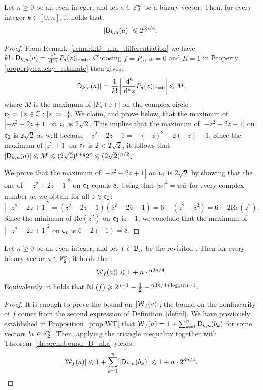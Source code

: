 \documentclass[11pt]{llncs}
\begin{document}
\begin{theorem}\label{theorem:bound_D_nka}
    Let $n\geq 0$ be an even integer, and let $a\in\F_2^n$ be a binary vector. Then, for every integer $k\in[0,n]$, it holds that:
    \[
        |\Dnka nka|\leq 2^{3n/4}.
    \]
\end{theorem}

\begin{proof}
    From Remark~\ref{remark:D_nka_differentiation} we have $k!\cdot\Dnka nka=\frac{\dd^k}{\dd^k z}P_a(z)\vert_{z=0}$. Choosing $f=P_a$, $w=0$ and $R=1$ in Property \ref{property:cauchy_estimate} then gives:
    \[
        |\Dnka nka|=\frac{1}{k!}\left|\frac{\dd^k}{\dd^k z}P_a(z)\vert_{z=0}\right|\leq M,
    \]
    where $M$ is the maximum of $|P_a(z)|$ on the complex circle $\dis=\{ z \in \C: |z|=1  \}$.
    We claim, and prove below, that the maximum of $\left|-z^2+2z+1\right|$ on $\dis$ is $2\sqrt 2$. 
    This implies that the maximum of $\left|-z^2-2z+1\right|$ on $\dis$ is $2\sqrt 2$ as well because $-z^2-2z+1=-(-z)^2+2(-z)+1$. 
    Since the maximum of $\left|z^2+1\right|$ on $\dis$ is $2<2\sqrt 2$, it follows that $|\Dnka nka|\leq M\leq (2\sqrt 2)^{p+q}2^r\leq (2\sqrt 2)^{n/2}$.

	We prove that the maximum of $|-z^2+2z+1|$ on $\dis$ is $2\sqrt 2$ by showing that the one of $|-z^2+2z+1|^2$ on $\dis$ equals $8$.
    Using that $|w|^2=w\overline w$ for every complex number $w$, we obtain for all $z\in \dis$:
    \[
        \left|-z^2+2z+1\right|^2=\left(z^2-2z-1\right)\left(\overline z^2-2\overline z-1\right)=6-\left(z^2+\overline z^2\right)=6-2\mathrm{Re}\left(z^2\right).
    \]
    Since the minimum of $\mathrm{Re}\left(z^2\right)$ on $\dis$ is $-1$, we conclude that the maximum of $|-z^2+2z+1|^2$ on $\dis$ is $6-2(-1)=8$.
\end{proof}

\begin{Corollary}\label{cor:bound_walsh_cauchy}
    Let $n\geq 0$ be an even integer, and let $f\in\BN$ be the revisited \hwbf{}. Then for every binary vector $a\in\F_2^n$, it holds that:
    \[
        |\wt f(a)|\leq 1+n\cdot 2^{3n/4}.
    \]
    Equivalently, it holds that $\NL(f)\geq 2^{n-1} - \frac{1}{2} -2^{3n/4 + \log_2(n) -1}$.
\end{Corollary}

\begin{proof}
    It is enough to prove the bound on $|\wt f(a)|$; the bound on the nonlinearity of $f$ comes from the second expression of Definition~\ref{def:nl}. We have previously established in Proposition~\ref{prop:WT} that $\wt{f}(a)=1+\sum_{k=1}^n\Dnka{n}{k}{b_k}$ for some vectors $b_k\in\F_2^n$. Then, applying the triangle inequality together with Theorem~\ref{theorem:bound_D_nka} yields:
    \[
        |\wt{f}(a)|\leq 1+\sum_{k=1}^n\left|\Dnka{n}{k}{b_k}\right|\leq 1+ n\cdot 2^{3n/4}.\qedhere
    \]
\end{proof}
\end{document}
